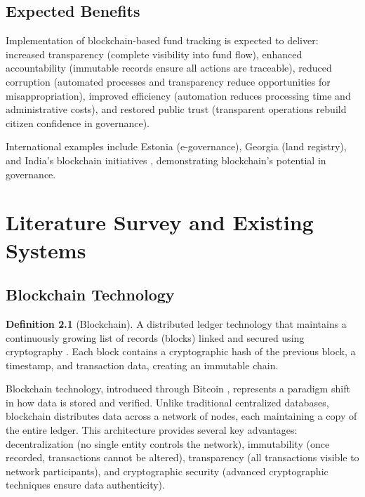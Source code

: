\documentclass[12pt,a4wide]{report}
\theoremstyle{plain}
\theoremstyle{definition}
\newtheorem{definition}[theorem]{Definition}
\theoremstyle{remark}
\begin{document}
\section{Expected Benefits}

Implementation of blockchain-based fund tracking is expected to deliver: increased transparency (complete visibility into fund flow), enhanced accountability (immutable records ensure all actions are traceable), reduced corruption (automated processes and transparency reduce opportunities for misappropriation), improved efficiency (automation reduces processing time and administrative costs), and restored public trust (transparent operations rebuild citizen confidence in governance).

International examples include Estonia \cite{estonia2017} (e-governance), Georgia \cite{georgia2016} (land registry), and India's blockchain initiatives \cite{india2021}, demonstrating blockchain's potential in governance.

\chapter{Literature Survey and Existing Systems}

\section{Blockchain Technology}

\begin{definition}[Blockchain]
A distributed ledger technology that maintains a continuously growing list of records (blocks) linked and secured using cryptography \cite{nakamoto2008}. Each block contains a cryptographic hash of the previous block, a timestamp, and transaction data, creating an immutable chain.
\end{definition}

Blockchain technology, introduced through Bitcoin \cite{nakamoto2008}, represents a paradigm shift in how data is stored and verified. Unlike traditional centralized databases, blockchain distributes data across a network of nodes, each maintaining a copy of the entire ledger. This architecture provides several key advantages: decentralization (no single entity controls the network), immutability (once recorded, transactions cannot be altered), transparency (all transactions visible to network participants), and cryptographic security (advanced cryptographic techniques ensure data authenticity).
\end{document}
